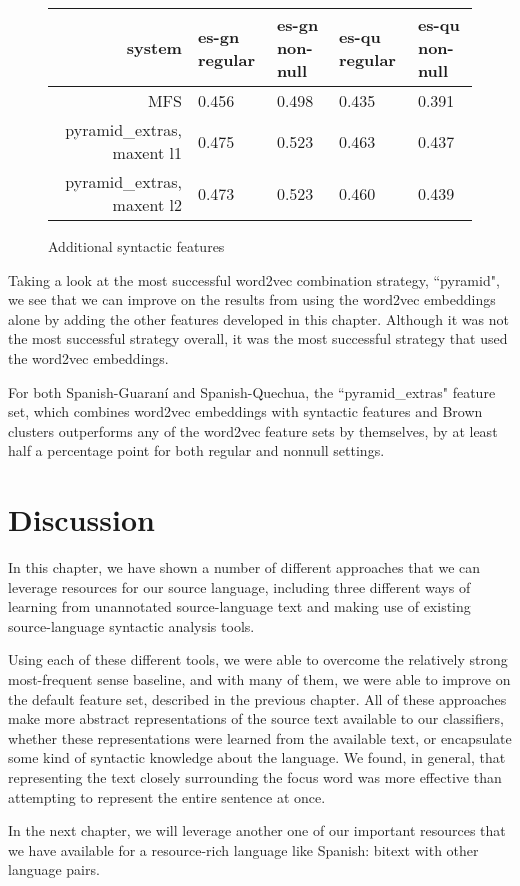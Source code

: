 \begin{figure*}
  \begin{centering}
  \begin{tabular}{|r|l|l|l|l|}
    \hline
    system & es-gn regular & es-gn non-null & es-qu regular & es-qu non-null \\
    \hline
    MFS    & 0.456 & 0.498 & 0.435 & 0.391 \\
    \hline
    pyramid\_extras, maxent l1 & 0.475 & 0.523 & 0.463 & 0.437 \\
    \hline
    pyramid\_extras, maxent l2 & 0.473 & 0.523 & 0.460 & 0.439 \\
    \hline
  \end{tabular}
  \end{centering}
  \caption{Additional syntactic features}
  \label{fig:syntacticfeatures}
\end{figure*}


Taking a look at the most successful word2vec combination strategy, ``pyramid",
we see that we can improve on the results from using the word2vec embeddings
alone by adding the other features developed in this chapter. Although it was
not the most successful strategy overall, it was the most successful strategy
that used the word2vec embeddings.

For both Spanish-Guaraní and Spanish-Quechua, the ``pyramid\_extras" feature
set, which combines word2vec embeddings with syntactic features and Brown
clusters outperforms any of the word2vec feature sets by themselves, by at
least half a percentage point for both regular and nonnull settings. 

\section{Discussion}
In this chapter, we have shown a number of different approaches that we can
leverage resources for our source language, including three different ways of
learning from unannotated source-language text and making use of existing
source-language syntactic analysis tools.

Using each of these different tools, we were able to overcome the relatively
strong most-frequent sense baseline, and with many of them, we were able to
improve on the default feature set, described in the previous chapter. All of
these approaches make more abstract representations of the source text
available to our classifiers, whether these representations were learned from
the available text, or encapsulate some kind of syntactic knowledge about the
language. We found, in general, that representing the text closely surrounding
the focus word was more effective than attempting to represent the entire
sentence at once.

In the next chapter, we will leverage another one of our important resources
that we have available for a resource-rich language like Spanish: bitext with
other language pairs.
